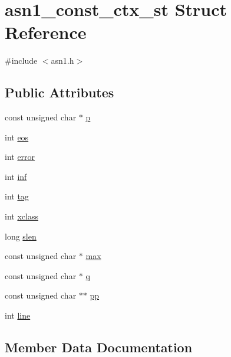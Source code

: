 \hypertarget{structasn1__const__ctx__st}{}\section{asn1\+\_\+const\+\_\+ctx\+\_\+st Struct Reference}
\label{structasn1__const__ctx__st}


{\ttfamily \#include $<$asn1.\+h$>$}

\subsection*{Public Attributes}
\begin{DoxyCompactItemize}
\item 
const unsigned char $\ast$ \hyperlink{structasn1__const__ctx__st_a7b1479e0de9e547ae50c83fa4ffbed07}{p}
\item 
int \hyperlink{structasn1__const__ctx__st_a649ad5c068ec65b6d8cee56b95619fc9}{eos}
\item 
int \hyperlink{structasn1__const__ctx__st_aa281e6701fb7934c2cca8c7a686372f8}{error}
\item 
int \hyperlink{structasn1__const__ctx__st_a29867a3ac1efeae0c85e6de7989ce000}{inf}
\item 
int \hyperlink{structasn1__const__ctx__st_afecdc50f4ad882589b5003b96e60a7ef}{tag}
\item 
int \hyperlink{structasn1__const__ctx__st_ae7e37b4b1a3f13d4b220f7ddf084b662}{xclass}
\item 
long \hyperlink{structasn1__const__ctx__st_ae0e8c4c5c13f58bf7ecb108b7c5b5e71}{slen}
\item 
const unsigned char $\ast$ \hyperlink{structasn1__const__ctx__st_a800940377825d8d1aa2a2040ce78d908}{max}
\item 
const unsigned char $\ast$ \hyperlink{structasn1__const__ctx__st_a114e72fe35806cdb7846e39440450c76}{q}
\item 
const unsigned char $\ast$$\ast$ \hyperlink{structasn1__const__ctx__st_a576eca9e431bff6f31af32d0973ec700}{pp}
\item 
int \hyperlink{structasn1__const__ctx__st_acd270a3b54b4ec360447b76a44410943}{line}
\end{DoxyCompactItemize}


\subsection{Member Data Documentation}

